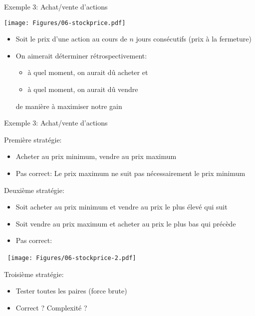 \begin{frame}{Exemple 3: Achat/vente d'actions}

\centerline{\texttt{[image: Figures/06-stockprice.pdf]}}

\bigskip

\begin{itemize}
\item Soit le prix d'une action au cours de $n$ jours consécutifs (prix à la fermeture)
\item On aimerait déterminer rétrospectivement:
\begin{itemize}
\item à quel moment, on aurait dû acheter et
\item à quel moment, on aurait dû vendre
\end{itemize}
de manière à maximiser notre gain
\end{itemize}

\end{frame}

\begin{frame}{Exemple 3: Achat/vente d'actions}

Première stratégie:
\begin{itemize}
\item Acheter au prix minimum, vendre au prix maximum
\pause
\item Pas correct: Le prix maximum ne suit pas nécessairement le prix minimum
\end{itemize}

\bigskip
\pause
Deuxième stratégie:
\begin{itemize}
\item Soit acheter au prix minimum et vendre au prix le plus élevé qui suit
\item Soit vendre au prix maximum et acheter au prix le plus bas qui précède
\pause
\item Pas correct:
\end{itemize}
\vspace{-0.5cm}
~\hfill\texttt{[image: Figures/06-stockprice-2.pdf]}

\bigskip
\vspace{-0.5cm}
\pause
Troisième stratégie:
\begin{itemize}
\item Tester toutes les paires (force brute)
\item Correct ? Complexité ?
\end{itemize}
\end{frame}

